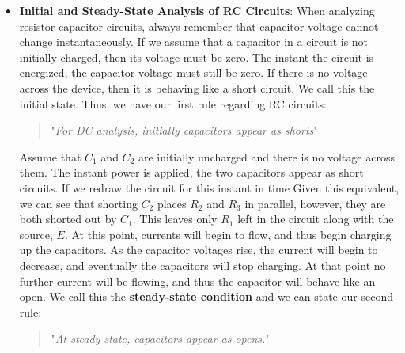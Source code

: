 \documentclass{report}
\begin{document}
\begin{itemize}
            \begin{quote}
               "\textit{The voltage across a capacitor cannot change instantaneously.}" 
            \end{quote}
            Note that instantaneous change means the voltage changes in zero time. Thus, the rate becomes infinitely large. This would force the current $i$ to also be infinite.
            \bigbreak \noindent 
            This observation will be key to understanding the operation of capacitors in DC circuits.
        \item \textbf{Initial and Steady-State Analysis of RC Circuits}: When analyzing resistor-capacitor circuits, always remember that capacitor voltage cannot change instantaneously. If we assume that a capacitor in a circuit is not initially charged, then its voltage must be zero. 
            \bigbreak \noindent 
            The instant the circuit is energized, the capacitor voltage must still be zero. If there is no voltage across the device, then it is behaving like a short circuit. We call this the initial state. Thus, we have our first rule regarding RC circuits:
            \begin{quote}
                "\textit{For DC analysis, initially capacitors appear as shorts}"
            \end{quote}
            Assume that $C_{1}$ and $C_{2}$ are initially uncharged and there is no voltage across them.
            \bigbreak \noindent 
            \bigbreak \noindent 
            The instant power is applied, the two capacitors appear as short circuits. If we redraw the circuit for this instant in time
            \bigbreak \noindent 
            \bigbreak \noindent 
            Given this equivalent, we can see that shorting $C_2$ places $R_2$ and $R_3$ in parallel, however, they are both shorted out by $C_1$. This leaves only $R_1$ left in the circuit along with the source, $E$. At this point, currents will begin to flow, and thus begin charging up the capacitors. As the capacitor voltages rise, the current will begin to decrease, and eventually the capacitors will stop charging. At that point no further current will be flowing, and thus the capacitor will behave like an open. We call this the \textbf{steady-state condition} and we can state our second rule:
            \begin{quote}
               "\textit{At steady-state, capacitors appear as opens.}" 
            \end{quote}

\end{itemize}
\end{document}
